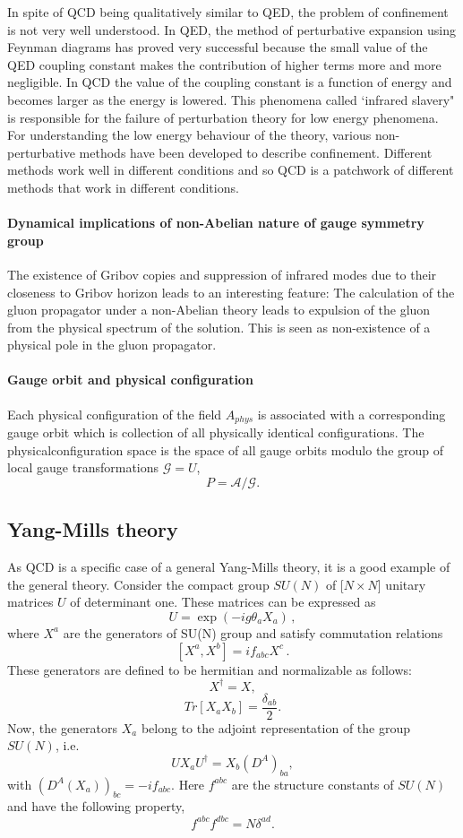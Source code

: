 In spite of QCD being qualitatively similar to QED, the problem of
confinement is not very well understood. In QED, the method of
perturbative expansion using Feynman diagrams has proved very successful
because the small value of the QED coupling constant makes the
contribution of higher terms more and more negligible. In QCD the value
of the coupling constant is a function of energy and becomes larger as
the energy is lowered. This phenomena called `infrared slavery" is
responsible for the failure of perturbation theory for low energy
phenomena. For understanding the low energy behaviour of the theory,
various non-perturbative methods have been developed to describe
confinement. Different methods work well in different conditions and so
QCD is a patchwork of different methods that work in different
conditions.

\paragraph{Dynamical implications of non-Abelian nature of gauge symmetry
group}
The existence of Gribov copies and suppression of infrared modes due to
their closeness to Gribov horizon leads to an interesting feature: The
calculation of the gluon propagator under a non-Abelian theory leads to
expulsion of the gluon from the physical spectrum of the solution. This
is seen as non-existence of a physical pole in the gluon propagator.

\paragraph{Gauge orbit and physical configuration}
Each physical configuration of the field $ A_{phys} $ is associated with
a corresponding gauge orbit which is collection of all physically
identical configurations. The physicalconfiguration space is the space of
all gauge orbits modulo the group of local gauge transformations
$\mathcal{G}={U}$, $$P=\mathcal{A}/\mathcal{G}.$$


\subsection{Yang-Mills theory}
As QCD is a specific case of a general Yang-Mills theory, it is a good
example of the general theory. Consider the compact group $SU(N)$ of
[$N\!\times\!N$]
unitary matrices $U$ of determinant one. These matrices can be expressed
as
\[
U = \exp(-ig\theta_{a}X_{a})
\,,
\]
where $X^{a}$ are the generators of
SU(N) group and satisfy commutation relations
\[
[X^{a},X^{b}]=i f_{abc}X^{c}
\,.
\]
These generators are defined to be hermitian and normalizable
as follows: $$X^{\dagger}=X,$$ $$Tr[X_{a}X_{b}]=\frac{\delta_{ab}}{2}.$$
Now, the generators $X_{a}$ belong to the adjoint representation of the
group $SU(N)$, i.e. $$U X_{a}U^{\dagger}=X_{b} (D^{A})_{ba},$$ with
$(D^{A}(X_{a}))_{bc}=-if_{abc}$. Here $f^{abc}$ are the structure
constants of $SU(N)$ and have the following property, $$f^{abc}f^{dbc}=N
\delta^{ad}.$$

